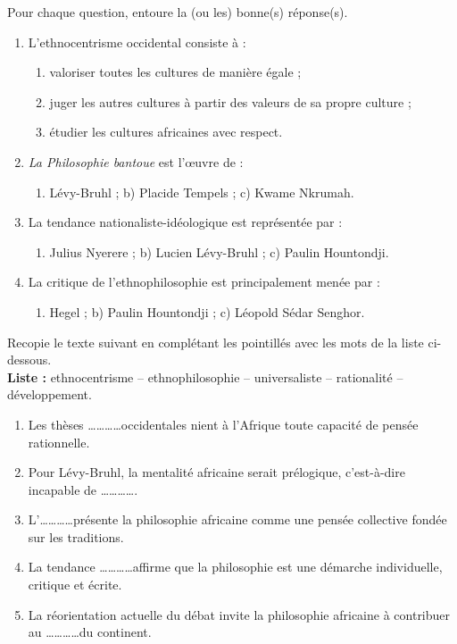 \documentclass[11pt]{article}
\begin{document}
\begin{exercice}[QCM]
Pour chaque question, entoure la (ou les) bonne(s) réponse(s).
\begin{enumerate}
  \item L'ethnocentrisme occidental consiste à :
  \begin{enumerate}
    \item[a)] valoriser toutes les cultures de manière égale ;
    \item[b)] juger les autres cultures à partir des valeurs de sa propre culture ;
    \item[c)] étudier les cultures africaines avec respect.
  \end{enumerate}
  \item \textit{La Philosophie bantoue} est l'œuvre de :
  \begin{enumerate}
    \item[a)] Lévy-Bruhl ; \quad b) Placide Tempels ; \quad c) Kwame Nkrumah.
  \end{enumerate}
  \item La tendance nationaliste-idéologique est représentée par :
  \begin{enumerate}
    \item[a)] Julius Nyerere ; \quad b) Lucien Lévy-Bruhl ; \quad c) Paulin Hountondji.
  \end{enumerate}
  \item La critique de l'ethnophilosophie est principalement menée par :
  \begin{enumerate}
    \item[a)] Hegel ; \quad b) Paulin Hountondji ; \quad c) Léopold Sédar Senghor.
  \end{enumerate}
\end{enumerate}
\end{exercice}

\begin{exercice}
Recopie le texte suivant en complétant les pointillés avec les mots de la liste ci-dessous.\\[0.5em]
\textbf{Liste :} ethnocentrisme -- ethnophilosophie -- universaliste -- rationalité -- développement.

\begin{enumerate}
  \item Les thèses \ldots\ldots\ldots\ldots occidentales nient à l'Afrique toute capacité de pensée rationnelle.
  \item Pour Lévy-Bruhl, la mentalité africaine serait prélogique, c'est-à-dire incapable de \ldots\ldots\ldots\ldots .
  \item L'\ldots\ldots\ldots\ldots présente la philosophie africaine comme une pensée collective fondée sur les traditions.
  \item La tendance \ldots\ldots\ldots\ldots affirme que la philosophie est une démarche individuelle, critique et écrite.
  \item La réorientation actuelle du débat invite la philosophie africaine à contribuer au \ldots\ldots\ldots\ldots du continent.
\end{enumerate}
\end{exercice}
\end{document}
